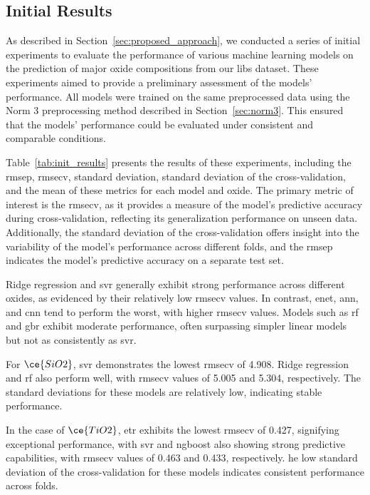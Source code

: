 \subsection{Initial Results}
As described in Section~\ref{sec:proposed_approach}, we conducted a series of initial experiments to evaluate the performance of various machine learning models on the prediction of major oxide compositions from our \gls{libs} dataset.
These experiments aimed to provide a preliminary assessment of the models' performance.
All models were trained on the same preprocessed data using the Norm 3 preprocessing method described in Section~\ref{sec:norm3}.
This ensured that the models' performance could be evaluated under consistent and comparable conditions.

Table~\ref{tab:init_results} presents the results of these experiments, including the \gls{rmsep}, \gls{rmsecv}, standard deviation, standard deviation of the cross-validation, and the mean of these metrics for each model and oxide.
The primary metric of interest is the \gls{rmsecv}, as it provides a measure of the model's predictive accuracy during cross-validation, reflecting its generalization performance on unseen data.
Additionally, the standard deviation of the cross-validation offers insight into the variability of the model's performance across different folds, and the \gls{rmsep} indicates the model's predictive accuracy on a separate test set.

Ridge regression and \gls{svr} generally exhibit strong performance across different oxides, as evidenced by their relatively low \gls{rmsecv} values.
In contrast, \gls{enet}, \gls{ann}, and \gls{cnn} tend to perform the worst, with higher \gls{rmsecv} values.
Models such as \gls{rf} and \gls{gbr} exhibit moderate performance, often surpassing simpler linear models but not as consistently as \gls{svr}.

For $\ce{SiO2}$, \gls{svr} demonstrates the lowest \gls{rmsecv} of 4.908.
Ridge regression and \gls{rf} also perform well, with \gls{rmsecv} values of 5.005 and 5.304, respectively.
The standard deviations for these models are relatively low, indicating stable performance.

In the case of $\ce{TiO2}$, \gls{etr} exhibits the lowest \gls{rmsecv} of 0.427, signifying exceptional performance, with \gls{svr} and \gls{ngboost} also showing strong predictive capabilities, with \gls{rmsecv} values of 0.463 and 0.433, respectively.
he low standard deviation of the cross-validation for these models indicates consistent performance across folds.

